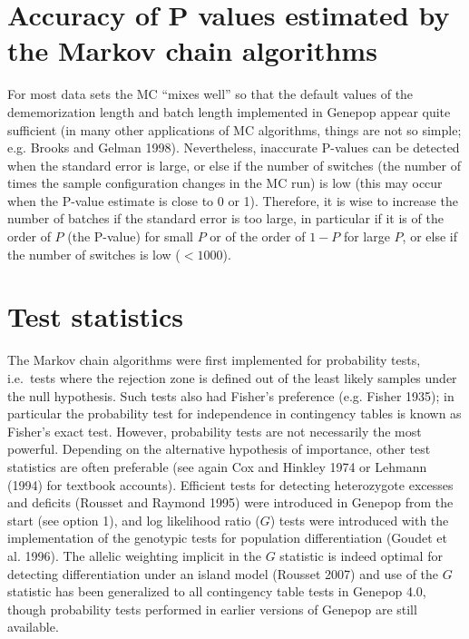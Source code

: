 \documentclass[12pt,]{book}
\theoremstyle{definition}
\theoremstyle{definition}
\theoremstyle{definition}
\theoremstyle{remark}
\begin{document}
\section{Accuracy of P values estimated by the Markov chain
algorithms}\label{accuracy-of-p-values-estimated-by-the-markov-chain-algorithms}

 For most data sets the MC
``mixes well'' so that the default values of the dememorization length
and batch length implemented in Genepop appear quite sufficient (in many
other applications of MC algorithms, things are not so simple; e.g.
Brooks and Gelman 1998). Nevertheless, inaccurate P-values can be
detected when the standard error is large, or else if the number of
switches (the number of times the sample configuration changes in the MC
run) is low (this may occur when
the P-value estimate is close to 0 or 1). Therefore, it is wise to
increase the number of batches if the standard error is too large, in
particular if it is of the order of \(P\) (the P-value) for small \(P\)
or of the order of \(1-P\) for large \(P\), or else if the number of
switches is low (\(<1000\)).

\section{Test statistics}\label{test-statistics}

The Markov chain algorithms were first implemented for probability
tests, i.e.~tests where the rejection zone is defined out of the least
likely samples under the null
hypothesis. Such tests also had
Fisher's preference (e.g. Fisher 1935); in particular the probability
test for independence in contingency tables is known as Fisher's exact
test. However, probability tests are not
necessarily the most powerful. Depending on the alternative hypothesis
of importance, other test statistics are often preferable (see again Cox
and Hinkley 1974 or Lehmann (1994) for textbook accounts). Efficient
tests for detecting heterozygote excesses and deficits (Rousset and
Raymond 1995) were introduced in Genepop from the start (see option 1),
and log likelihood ratio (\(G\)) tests were introduced with the
implementation of the genotypic tests for population differentiation
(Goudet et al. 1996). The allelic weighting implicit in the \(G\)
statistic is indeed optimal for detecting differentiation under an
island model (Rousset 2007) and use of the \(G\) statistic has been
generalized to all contingency table tests in Genepop 4.0, though
probability tests performed in earlier versions of Genepop are still
available.
\end{document}
